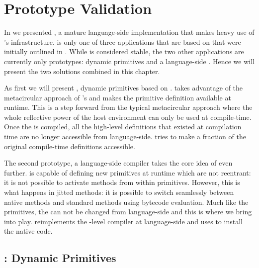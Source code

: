 

\chapter{\B Prototype Validation}
\minitoc
\introduction

In  we presented \NB, a mature language-side \FFI implementation that makes heavy use of \B's infrastructure.
\NB is only one of three applications that are based on \B that were initially outlined in .
While \NB is considered stable, the two other applications are currently only prototypes: dynamic primitives and a language-side \JIT.
Hence we will present the two solutions combined in this chapter.

As first we will present \WF, dynamic primitives based on \B.
\WF takes advantage of the metacircular approach of \PH's \VM and makes the primitive definition available at runtime.
This is a step forward from the typical metacircular approach where the whole reflective power of the host environment can only be used at compile-time.
Once the \VM is compiled, all the high-level definitions that existed at compilation time are no longer accessible from language-side.
\WF tries to make a fraction of the original compile-time definitions accessible.

The second prototype, \NB a language-side \JIT compiler takes the core idea of \WF even further.
\WF is capable of defining new primitives at runtime which are not reentrant: it is not possible to activate \PH methods from within primitives.
However, this is what happens in jitted methods: it is possible to switch seamlessly between native methods and standard \PH methods using bytecode evaluation.
Much like the primitives, the \JIT can not be changed from language-side and this is where we bring \NBJ into play.
\NBJ reimplements the \VM-level \JIT compiler at language-side and uses \B to install the native code.


\newpage
\section{\WF: Dynamic Primitives}


